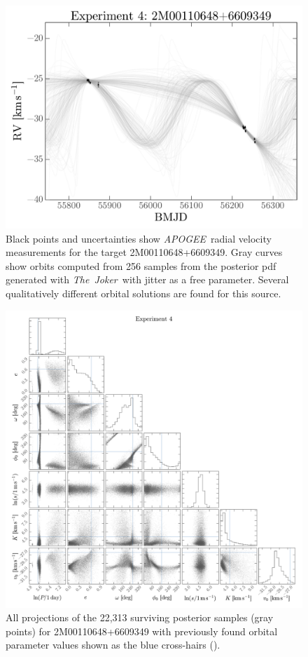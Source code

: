 \documentclass[manuscript, letterpaper]{aastex6}
\newcommand{\project}[1]{\textsl{#1}}
\newcommand{\acronym}[1]{{\small{#1}}}
\newcommand{\apogee}{\project{\acronym{APOGEE}}}
\newcommand{\samplername}{\project{The~Joker}}
\begin{document}
\begin{figure}[p]
\begin{center}
\includegraphics[width=\textwidth]{figures/apogee-rv-curves.pdf}
\end{center}
\caption{%
Black points and uncertainties show \apogee\ radial velocity measurements for
the target 2M00110648+6609349.
Gray curves show orbits computed from 256 samples from the posterior pdf
generated with \samplername\ with jitter as a free parameter.
Several qualitatively different orbital solutions are found for this source.
\label{fig:apogee-rv}}
\end{figure}

\begin{figure}[p]
\begin{center}
\includegraphics[width=\textwidth]{figures/apogee-corner.pdf}
\end{center}
\caption{%
All projections of the 22,313 surviving posterior samples (gray points)
for 2M00110648+6609349 with
previously found orbital parameter values shown as the blue cross-hairs
(\citealt{Troup:2016}).
\label{fig:apogee-corner}}
\end{figure}
\end{document}
